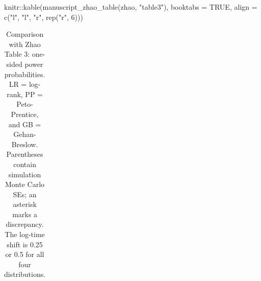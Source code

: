 \documentclass[
  12pt]{article}
\newenvironment{Shaded}{\begin{snugshade}}{\end{snugshade}}
\newcommand{\AttributeTok}[1]{\textcolor[rgb]{0.40,0.45,0.13}{#1}}
\newcommand{\ConstantTok}[1]{\textcolor[rgb]{0.56,0.35,0.01}{#1}}
\newcommand{\DecValTok}[1]{\textcolor[rgb]{0.68,0.00,0.00}{#1}}
\newcommand{\FunctionTok}[1]{\textcolor[rgb]{0.28,0.35,0.67}{#1}}
\newcommand{\NormalTok}[1]{\textcolor[rgb]{0.00,0.23,0.31}{#1}}
\newcommand{\SpecialCharTok}[1]{\textcolor[rgb]{0.37,0.37,0.37}{#1}}
\newcommand{\StringTok}[1]{\textcolor[rgb]{0.13,0.47,0.30}{#1}}
\begin{document}
\begin{Shaded}
\begin{Highlighting}[]
\NormalTok{knitr}\SpecialCharTok{::}\FunctionTok{kable}\NormalTok{(}\FunctionTok{manuscript\_zhao\_table}\NormalTok{(zhao, }\StringTok{"table3"}\NormalTok{), }\AttributeTok{booktabs =} \ConstantTok{TRUE}\NormalTok{,}
             \AttributeTok{align =} \FunctionTok{c}\NormalTok{(}\StringTok{"l"}\NormalTok{, }\StringTok{"l"}\NormalTok{, }\StringTok{"r"}\NormalTok{, }\FunctionTok{rep}\NormalTok{(}\StringTok{"r"}\NormalTok{, }\DecValTok{6}\NormalTok{)))}
\end{Highlighting}
\end{Shaded}

{

\begin{longtable}[]{@{}
  >{\raggedright\arraybackslash}p{}
  >{\raggedright\arraybackslash}p{}
  >{\raggedleft\arraybackslash}p{}
  >{\raggedleft\arraybackslash}p{}
  >{\raggedleft\arraybackslash}p{}
  >{\raggedleft\arraybackslash}p{}
  >{\raggedleft\arraybackslash}p{}
  >{\raggedleft\arraybackslash}p{}
  >{\raggedleft\arraybackslash}p{}@{}}

\caption{\label{tbl-zhao-power}Comparison with Zhao Table 3: one-sided
power probabilities. LR = log-rank, PP = Peto-Prentice, and GB =
Gehan-Breslow. Parentheses contain simulation Monte Carlo SEs; an
asterisk marks a discrepancy. The log-time shift is 0.25 or 0.5 for all
four distributions.}

\tabularnewline


\end{longtable}}
\end{document}
